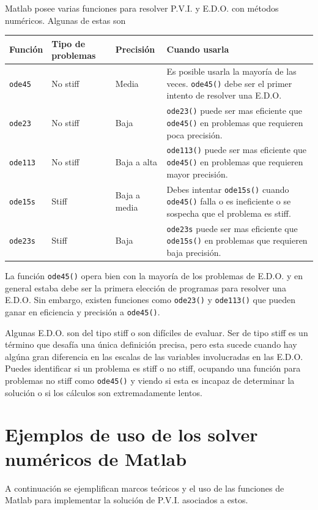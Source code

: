 \documentclass[11pt]{article}
\begin{document}
Matlab posee varias funciones para resolver P.V.I. y E.D.O. con m\'etodos num\'ericos. Algunas de estas son 
\begin{center}
\begin{tabular}{||p{}|p{}|p{}|p{}||}
\hline
{\bf Funci\'on 	}	&	{\bf Tipo de problemas} &	{\bf Precisi\'on} & {\bf Cuando usarla }\\ \hline
\texttt{ode45} 	&	No stiff	& Media			& Es posible usarla la mayoría de las veces. \texttt{ode45()} debe ser el primer intento de resolver una E.D.O.		\\
\texttt{ode23}  & No stiff		& Baja			& \texttt{ode23()} puede ser mas eficiente que \texttt{ode45()} en problemas que requieren poca precisi\'on.		\\
\texttt{ode113}	& No stiff 		& Baja a alta	& \texttt{ode113()} puede ser mas eficiente que \texttt{ode45()} en problemas que requieren mayor precisi\'on.		\\
\texttt{ode15s}	& Stiff			& Baja a media	& Debes intentar  \texttt{ode15s()} cuando \texttt{ode45()} falla o es ineficiente o se sospecha que el problema es stiff. \\
\texttt{ode23s}	&Stiff			& Baja			& \texttt{ode23s} puede ser mas eficiente que \texttt{ode15s()} en problemas que requieren baja precisi\'on. \\ \hline
\end{tabular}
\end{center}

La funci\'on \texttt{ode45()} opera bien con la mayor\'ia de los problemas de E.D.O. y en general estaba debe ser la primera elecci\'on de programas para resolver una E.D.O. Sin embargo, existen funciones como \texttt{ode23()} y \texttt{ode113()} que pueden ganar en eficiencia y precisi\'on a \texttt{ode45()}.

Algunas E.D.O. son del tipo stiff o son dif\'iciles de evaluar. Ser de tipo stiff es un t\'ermino que desaf\'ia una \'unica definici\'on precisa, pero esta sucede cuando hay alg\'una gran diferencia en las escalas de las variables involucradas en las E.D.O. Puedes identificar si un problema es stiff o no stiff, ocupando una funci\'on para problemas no stiff como \texttt{ode45()} y viendo si esta es incapaz de determinar la soluci\'on o si los c\'alculos son extremadamente lentos. 

\section{Ejemplos de uso de los solver num\'ericos de Matlab}
A continuaci\'on se ejemplifican marcos te\'oricos y el uso de las funciones de Matlab para implementar la soluci\'on de P.V.I. asociados a estos.
\end{document}
